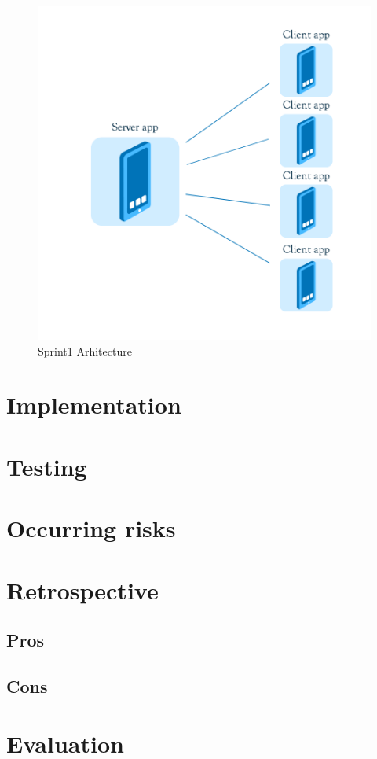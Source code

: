 \begin{figure}[!t]
	\centering
		\includegraphics[width=16cm]{sprint1/arhitecture.png}
	\caption{Sprint1 Arhitecture}
	\label{fig:sprint1_arhitecture}
\end{figure}

\section{Implementation}
\section{Testing}
\section{Occurring risks}
\section{Retrospective}
\subsection{Pros}
\subsection{Cons}
\section{Evaluation}